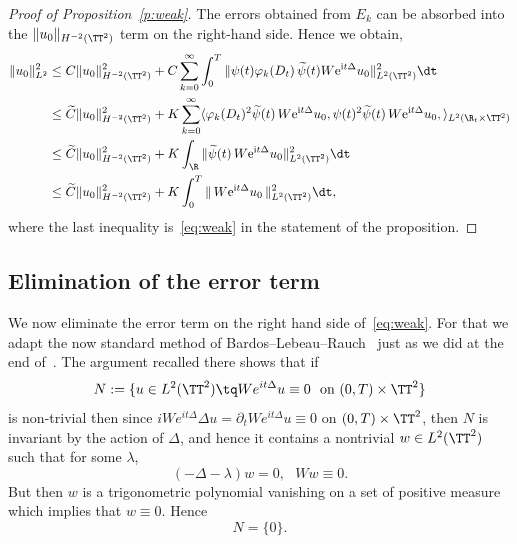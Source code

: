 \begin{proof}[Proof of Proposition~\ref{p:weak}]
The errors obtained from $ E_k $ can be absorbed into the $
\| u_0 \|_{ H^{-2} (\TT^2) } $ term on the right-hand side. Hence we obtain,
\begin{align*}
\|u_0 \|^2_{L^2} &\leq C \|u_0 \|_{H^{-2} (\TT^2)} ^2+ C \sum_{k=0}^\infty \int_{0}^T
\| \psi (t) \varphi_{k}(D_t)\, \widetilde \psi (t) W \mathrm{e}^{ \mathrm{i}t \Delta }u_0 \|^2_{L^2(\TT^2)} \dt\\
& \leq\widetilde C \|u_0 \|_{H^{-2} (\TT^2)} ^2+ K \sum_{k=0}^\infty
\langle \varphi_{k}(D_t)^2 \widetilde \psi (t) \, W \mathrm{e}^{\mathrm{i}t \Delta }u_0, \psi(t)^2 \widetilde \psi(t)\, W \mathrm{e}^{\mathrm{i}t \Delta}u_0, \rangle_{L^2 (\R_t \times \TT^2)} \\
& \leq \widetilde C \|u_0 \|_{H^{-2} (\TT^2)} ^2 + K \int_\R \| \widetilde \psi (t) \, W \mathrm{e}^{\mathrm{i}t \Delta} u_0\|^2_{L^2(\TT^2)} \dt \\
& \leq \widetilde C \|u_0 \|_{H^{-2} (\TT^2)} ^2 + K \int_{0}^T \|\, W\mathrm{e}^{\mathrm{i}t \Delta } u_0\, \|^2_{L^2(\TT^2)} \dt,
\end{align*}
where the last inequality is~\eqref{eq:weak} in the statement of the proposition.
\end{proof}

\subsection{Elimination of the error term}\label{eli}

We now eliminate the error term on the right hand side of~\eqref{eq:weak}. For that we adapt the now standard method of Bardos--Lebeau--Rauch~\cite{BLR} just as we did at the end of~\cite[Section~4]{BZ4}. The argument recalled there shows that if
\begin{equation}\label{eq:defN0}
N := \{ u \in L^2 (\TT^2) \tq W e^{ i t \Delta } u \equiv 0
\ \text{ on $ (0, T) \times \TT^2 $}\}
\end{equation}
is non-trivial then since $ iW e^{it\Delta } \Delta u= \partial_t W e^{ i t \Delta } u \equiv 0$ on $ (0, T) \times \TT^2 $, then $N$ is invariant by the action of $\Delta$, and hence it contains a nontrivial $ w \in L^2 (\TT^2) $ such that for some $ \lambda $,
\[
(- \Delta - \lambda) w = 0, \ \ \ W w \equiv 0.
\]
But then $ w $ is a trigonometric polynomial vanishing on a set of positive measure which implies that $ w \equiv 0 $. Hence
\begin{equation}\label{eq:N0}
N = \{ 0 \}.
\end{equation}

